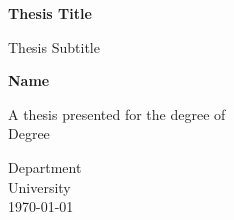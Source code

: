 \documentclass[class=book, crop=false]{standalone}
\begin{document}
    \begin{titlepage}
        \begin{center}
            \vspace*{1cm}
    
            \textbf{\LARGE{Thesis Title}}
    
            \vspace{0.5cm}
            Thesis Subtitle
                
            \vspace{1.5cm}
    
            \textbf{\Large{Name}}
    
            \vfill
                
            A thesis presented for the degree of
            \\
            Degree 
                
            \vspace{0.8cm}
        
                
            Department
            \\
            University
            \\
            \today
        \end{center}
    \end{titlepage}
\end{document}
